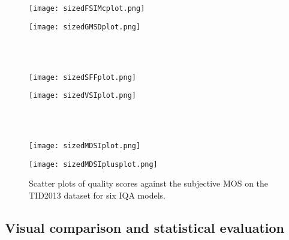 \begin{figure}[htb]
\scriptsize
\begin{minipage}[b]{0.49\linewidth}
  \centering
  \centerline{\texttt{[image: sizedFSIMcplot.png]}} 
\end{minipage}
\begin{minipage}[b]{.49\linewidth}
  \centering
  \centerline{\texttt{[image: sizedGMSDplot.png]}}
\end{minipage}
\\ \\
\begin{minipage}[b]{0.49\linewidth}
  \centering
  \centerline{\texttt{[image: sizedSFFplot.png]}}
\end{minipage}
\begin{minipage}[b]{0.49\linewidth}
  \centering
  \centerline{\texttt{[image: sizedVSIplot.png]}} 
\end{minipage}
\\ \\
\begin{minipage}[b]{.49\linewidth}
  \centering
  \centerline{\texttt{[image: sizedMDSIplot.png]}}
\end{minipage}
\begin{minipage}[b]{0.49\linewidth}
  \centering
  \centerline{\texttt{[image: sizedMDSIplusplot.png]}}
\end{minipage}
\caption{Scatter plots of quality scores against the subjective MOS on the TID2013 dataset for six IQA models.}
\label{scatter}
\end{figure}



\subsection{Visual comparison and statistical evaluation}
\label{significance}



